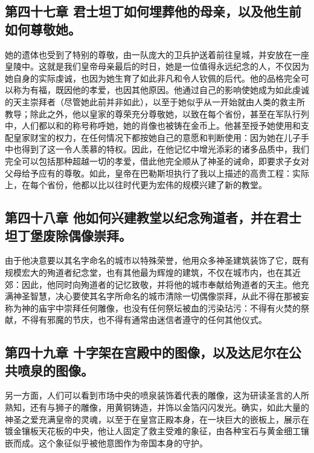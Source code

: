 \subsection{第四十七章 君士坦丁如何埋葬他的母亲，以及他生前如何尊敬她。}

她的遗体也受到了特别的尊敬，由一队庞大的卫兵护送着前往皇城，并安放在一座皇陵中。这就是我们皇帝母亲最后的时日，她是一位值得永远纪念的人，不仅因为她自身的实际虔诚，也因为她生育了如此非凡和令人钦佩的后代。他的品格完全可以称为有福，既因他的孝爱，也因其他原因。他通过自己的影响使她成为如此虔诚的天主崇拜者（尽管她此前并非如此），以至于她似乎从一开始就由人类的救主所教导；除此之外，他以皇家的尊荣充分尊敬她，以致在每个省份，甚至在军队行列中，人们都以和的称号称呼她，她的肖像也被铸在金币上。他甚至授予她使用和支配皇家财宝的权力，在任何情况下都按她自己的意愿和判断使用：因为她在儿子手中也得到了这一令人羡慕的特权。因此，在他记忆中增光添彩的诸多品质中，我们完全可以包括那种超越一切的孝爱，借此他完全顺从了神圣的诫命，即要求子女对父母给予应有的尊敬。如此，皇帝在巴勒斯坦执行了我以上描述的高贵工程：实际上，在每个省份，他都以比以往时代更为宏伟的规模兴建了新的教堂。\par


\subsection{第四十八章 他如何兴建教堂以纪念殉道者，并在君士坦丁堡废除偶像崇拜。}

由于他决意要以其名字命名的城市以特殊荣誉，他用众多神圣建筑装饰了它，既有规模宏大的殉道者纪念堂，也有其他最为辉煌的建筑，不仅在城市内，也在其近郊：因此，他同时向殉道者的记忆致敬，并将他的城市奉献给殉道者的天主。他充满神圣智慧，决心要使其名字所命名的城市清除一切偶像崇拜，从此不得在那被妄称为神的庙宇中崇拜任何雕像，也没有任何祭坛被血的污染玷污：不得有火焚的祭献，不得有邪魔的节庆，也不得有通常由迷信者遵守的任何其他仪式。\par


\subsection{第四十九章 十字架在宫殿中的图像，以及达尼尔在公共喷泉的图像。}

另一方面，人们可以看到市场中央的喷泉装饰着代表的雕像，这为研读圣言的人所熟知，还有与狮子的雕像，用黄铜铸造，并饰以金箔闪闪发光。确实，如此大量的神圣之爱充满皇帝的灵魂，以至于在皇宫正殿本身，在一块巨大的嵌板上，展示在镀金镶板天花板的中央，他让人固定了救主受难的象征，由各种宝石与黄金细工镶嵌而成。这个象征似乎被他意图作为帝国本身的守护。\par

